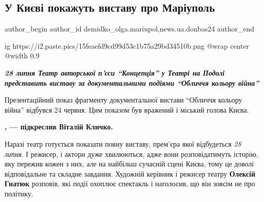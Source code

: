 
 
 
 
 
 
\subsection{У Києві покажуть виставу про Маріуполь}
\label{sec:20_07_2022.stz.news.ua.donbas24.1.u_kyevi_pokazhut_vystavu_pro_mariupol}
 
\ifcmt
 author_begin
   author_id demidko_olga.mariupol,news.ua.donbas24
 author_end
\fi

\ifcmt
  ig https://i2.paste.pics/15feaefd9cd99d53c1b75a29bd34510b.png
  @wrap center
  @width 0.9
\fi

\begin{center}
\Large\em\bfseries\color{blue}
28 липня Театр авторської п'єси \enquote{Концепція} у Театрі на Подолі представить
виставу за документальними подіями \enquote{Обличчя кольору війна}
\end{center}

Презентаційний показ фрагменту документальної вистави \enquote{Обличчя кольору війна}
відбувся 24 червня. Цим показом був вражений і міський голова Києва. 

\begin{leftbar}
	\begingroup
		\bfseries
{}, — підкреслив Віталій Кличко.
	\endgroup
\end{leftbar}


Наразі театр готується показати повну виставу, прем'єра якої відбудеться \emph{28
липня}. І режисер, і актори дуже хвилюються, адже вони розповідатимуть історію,
яку пережив кожен з них, але на найбільш сучасній сцені Києва, тому це доволі
відповідальне та складне завдання. Художній керівник і режисер театру \textbf{Олексій
Гнатюк} розповів, які події охоплює спектакль і наголосив, що він зовсім не про
політику. 

